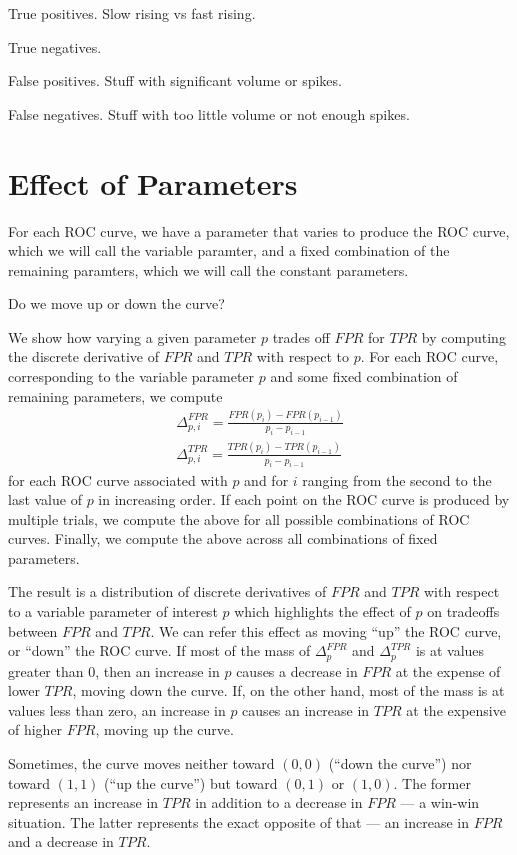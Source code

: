 True positives. Slow rising vs fast rising.

True negatives.

False positives. Stuff with significant volume or spikes.

False negatives. Stuff with too little volume or not enough spikes.

\section{Effect of Parameters}

For each ROC curve, we have a parameter that varies to produce the ROC curve,
which we will call the variable paramter, and a fixed combination of the
remaining paramters, which we will call the constant parameters.

Do we move up or down the curve?

We show how varying a given parameter $p$ trades off $FPR$ for $TPR$ by
computing the discrete derivative of $FPR$ and $TPR$ with respect to $p$. For
each ROC curve, corresponding to the variable parameter $p$ and some fixed
combination of remaining parameters, we compute
\begin{gather}
\Delta_{p,i}^{FPR} = \frac{FPR(p_{i}) - FPR(p_{i-1})}{p_i - p_{i-1}}\\
\Delta_{p,i}^{TPR} = \frac{TPR(p_{i}) - TPR(p_{i-1})}{p_i - p_{i-1}}
\end{gather}
for each ROC curve associated with $p$ and for $i$ ranging from the second to the last value
of $p$ in increasing order. If each point on the ROC curve is produced by
multiple trials, we compute the above for all possible combinations of ROC
curves. Finally, we compute the above across all combinations of fixed
parameters.

The result is a distribution of discrete derivatives of $FPR$ and $TPR$ with
respect to a variable parameter of interest $p$ which highlights the effect of
$p$ on tradeoffs between $FPR$ and $TPR$. We can refer this effect as moving
``up'' the ROC curve, or ``down'' the ROC curve. If most of the mass of
$\Delta_{p}^{FPR}$ and $\Delta_{p}^{TPR}$ is at values greater than 0, then an
increase in $p$ causes a decrease in $FPR$ at the expense of lower $TPR$, moving
down the curve. If, on the other hand, most of the mass is at values less than
zero, an increase in $p$ causes an increase in $TPR$ at the expensive of higher
$FPR$, moving up the curve.

Sometimes, the curve moves neither toward $(0,0)$ (``down the curve'') nor
toward $(1,1)$ (``up the curve'') but toward $(0,1)$ or $(1,0)$. The former
represents an increase in $TPR$ in addition to a decrease in $FPR$ --- a win-win
situation. The latter represents the exact opposite of that --- an increase in
$FPR$ and a decrease in $TPR$.

